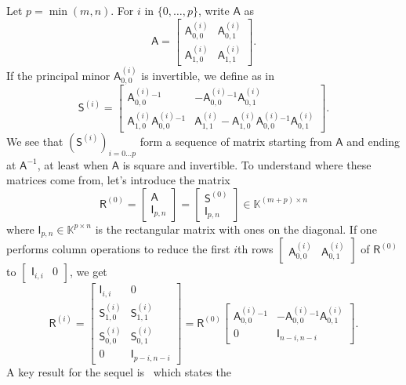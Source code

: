 \documentclass{sig-alternate}
\newcommand{\mA}{\ensuremath{\mathsf{A}}}
\newcommand{\mI}{\ensuremath{\mathsf{I}}}
\newcommand{\mR}{\ensuremath{\mathsf{R}}}
\newcommand{\mS}{\ensuremath{\mathsf{S}}}
\newcommand{\K}{\ensuremath{\mathbb{K}}}
\begin{document}
Let $p=\min(m,n)$. For $i$ in $\{0,\dots,p\}$, write $\mA$ as
$$
\mA=\begin{bmatrix}
    \mA^{(i)}_{0,0} & \mA^{(i)}_{0,1} \\[1mm]
    \mA^{(i)}_{1,0} & \mA^{(i)}_{1,1}
  \end{bmatrix}.
$$ 
If the principal minor
 ${\mA^{(i)}_{0,0}}$  is invertible, we define as in~\cite{Cardinal99}
$$
\mS^{(i)} = \begin{bmatrix} 
   {\mA^{(i)}_{0,0}}{}^{-1} &  -{\mA^{(i)}_{0,0}}{}^{-1} \mA^{(i)}_{0,1} \\[1mm]
    \mA^{(i)}_{1,0} {\mA^{(i)}_{0,0}}{}^{-1} & 
    \mA^{(i)}_{1,1} - \mA^{(i)}_{1,0} {\mA^{(i)}_{0,0}}{}^{-1} \mA^{(i)}_{0,1}
\end{bmatrix}.
$$
We see that $( \mS^{(i)})_{i=0\dots p}$ form a sequence of matrix starting from
$\mA$ and ending at $\mA^{-1}$, at least when $\mA$ is square and invertible. To
understand where these matrices come from, let's introduce the matrix
\[ \mR^{(0)} = \begin{bmatrix}
     \mA\\
     \mI_{p, n}
   \end{bmatrix} = \begin{bmatrix}
     \mS^{(0)}\\
     \mI_{p, n}
   \end{bmatrix} \in \K^{(m + p) \times n} 
\]
where $\mI_{p, n} \in \K^{p \times n}$ is the rectangular matrix with ones on
the diagonal. If one performs column operations to reduce the first $i$th rows
$\begin{bmatrix} \mA^{(i)}_{0,0} & \mA^{(i)}_{0,1} \end{bmatrix}$ of $\mR^{(0)}$
to $\begin{bmatrix} \mI_{i,i} & 0 \end{bmatrix}$, we get
\[ 
\mR^{(i)} = \begin{bmatrix}
     \mI_{i,i} & 0\\
     \mS^{(i)}_{1,0} & \mS^{(i)}_{1,1}\\
     \mS^{(i)}_{0,0} & \mS^{(i)}_{0,1}\\
     0 & \mI_{p - i, n - i}
   \end{bmatrix} = \mR^{(0)} \begin{bmatrix}
     \mA_{0, 0}^{(i)} \phantom{}^{- 1} & - \mA_{0, 0}^{(i)} \phantom{}^{- 1} \mA_{0,
     1}^{(i)}\\
     0 & \mI_{n - i,n-i}
   \end{bmatrix}. 
\]
A key result for the sequel is~\cite[Proposition~1]{Cardinal99} which states the
\end{document}
